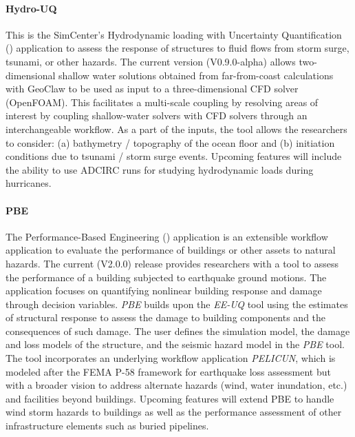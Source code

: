 \paragraph{Hydro-UQ} This is the SimCenter's Hydrodynamic loading with Uncertainty Quantification () application to assess the response of structures to fluid flows from storm surge, tsunami, or other hazards. The current version (V0.9.0-alpha) allows two-dimensional shallow water solutions obtained from far-from-coast calculations with GeoClaw  to be used as input to a three-dimensional CFD solver (OpenFOAM). This facilitates a multi-scale coupling by resolving areas of interest by coupling shallow-water solvers with CFD solvers through an interchangeable workflow. As a part of the inputs, the tool allows the researchers to consider: (a) bathymetry / topography of the ocean floor and (b) initiation conditions due to tsunami / storm surge events. Upcoming features will include the ability to use ADCIRC runs for studying hydrodynamic loads during hurricanes.

\paragraph{PBE} The Performance-Based Engineering () application is an extensible workflow application to evaluate the performance of buildings or other assets to natural hazards. The current (V2.0.0) release provides researchers with a tool to assess the performance of a building subjected to earthquake ground motions. The application focuses on quantifying nonlinear building response and damage through decision variables. \emph{PBE} builds upon the \emph{EE-UQ} tool using the estimates of structural response to assess the damage to building components and the consequences of such damage. The user defines the simulation model, the damage and loss models of the structure, and the seismic hazard model in the \emph{PBE} tool. The tool incorporates an underlying workflow application \emph{PELICUN}, which is modeled after the FEMA P-58 framework for earthquake loss assessment but with a broader vision to address alternate hazards (wind, water inundation, etc.) and facilities beyond buildings. Upcoming features will extend PBE to handle wind storm hazards to buildings as well as the performance assessment of other infrastructure elements such as buried pipelines.

